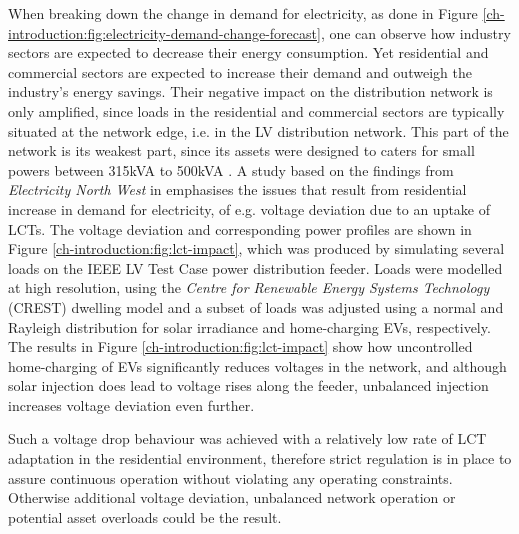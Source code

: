 
When breaking down the change in demand for electricity, as done in Figure \ref{ch-introduction:fig:electricity-demand-change-forecast}, one can observe how industry sectors are expected to decrease their energy consumption.
Yet residential and commercial sectors are expected to increase their demand and outweigh the industry's energy savings.
Their negative impact on the distribution network is only amplified, since loads in the residential and commercial sectors are typically situated at the network edge, i.e. in the LV distribution network.
This part of the network is its weakest part, since its assets were designed to caters for small powers between 315kVA to 500kVA \cite{EDS08-0115}.
A study based on the findings from \textit{Electricity North West} in \cite{ElectricityNorthWestLtd2014} emphasises the issues that result from residential increase in demand for electricity, of e.g. voltage deviation due to an uptake of LCTs.
The voltage deviation and corresponding power profiles are shown in Figure \ref{ch-introduction:fig:lct-impact}, which was produced by simulating several loads on the IEEE LV Test Case power distribution feeder.
Loads were modelled at high resolution, using the \textit{Centre for Renewable Energy Systems Technology} (CREST) dwelling model \cite{Richardson2010a} and a subset of loads was adjusted using a normal and Rayleigh distribution for solar irradiance and home-charging EVs, respectively.
The results in Figure \ref{ch-introduction:fig:lct-impact} show how uncontrolled home-charging of EVs significantly reduces voltages in the network, and although solar injection does lead to voltage rises along the feeder, unbalanced injection increases voltage deviation even further.



Such a voltage drop behaviour was achieved with a relatively low rate of LCT adaptation in the residential environment, therefore strict regulation is in place to assure continuous operation without violating any operating constraints.
Otherwise additional voltage deviation, unbalanced network operation or potential asset overloads could be the result.

